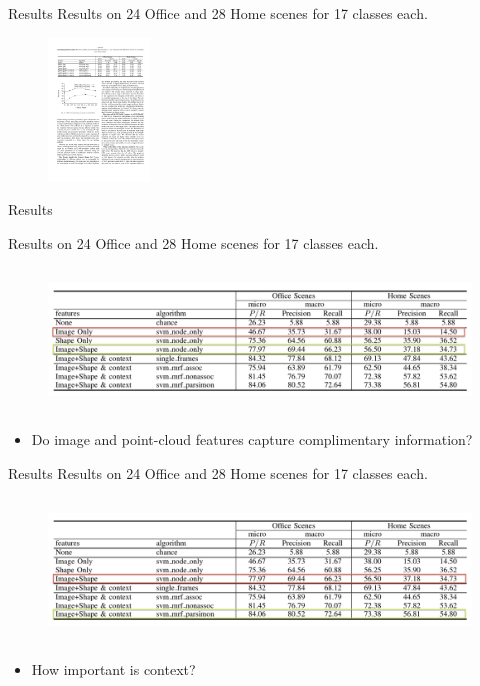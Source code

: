 \documentclass{beamer}
\begin{document}
\begin{frame}{Results }
Results on 24 Office and 28 Home scenes for 17 classes each.
\begin{figure}[t!]
\includegraphics[width=\linewidth,height=1.5in]{results_table.pdf}
\end{figure}
\end{frame}


\begin{frame}{Results }

Results on 24 Office and 28 Home scenes for 17 classes each.
\begin{figure}[t!]
\includegraphics[width=\linewidth,height=1.5in]{results_table1.png}
\end{figure}
{\small
\begin{itemize}
\item Do image and point-cloud features capture complimentary information? 
\end{itemize}
}
\end{frame}

\begin{frame}{Results } 
Results on 24 Office and 28 Home scenes for 17 classes each.
\begin{figure}[t!]
\includegraphics[width=\linewidth,height=1.5in]{results_table2.png}
\end{figure}
{\small
\begin{itemize}
\item How	important	is context?
\end{itemize}
}
\end{frame}
\end{document}

